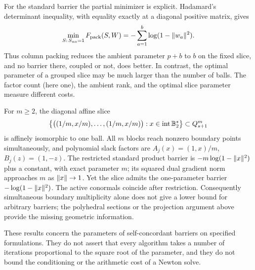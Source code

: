 For the standard barrier the partial minimizer is explicit.
Hadamard's determinant inequality, with equality exactly at a diagonal
positive matrix, gives
\[
 \min_{S:\,S_{aa}=1}F_{\mathrm{pack}}(S,W)
 =-\sum_{a=1}^b\log(1-\lVert w_a\rVert^2).
\]
Thus column packing reduces the ambient parameter $p+b$ to $b$ on the
fixed slice, and no barrier there, coupled or not, does better.
In contrast, the optimal parameter of a grouped slice may be much larger
than the number of balls.  The factor count (here one), the ambient
rank, and the optimal slice parameter measure different costs.

\begin{example}
\label{ex:duplicated-barrier}
For $m\geq2$, the diagonal affine slice
\[
 \left\{\bigl((1/m,x/m),\ldots,(1/m,x/m)\bigr):
                          x\in\operatorname{int}\mathbb B_2^s\right\}\subset Q_{s+1}^m
\]
is affinely isomorphic to one ball.  All $m$ blocks reach nonzero
boundary points simultaneously, and polynomial slack factors are
$A_j(x)=(1,x)/m$, $B_j(z)=(1,-z)$.
The restricted standard product barrier is
$-m\log(1-\lVert x\rVert^2)$ plus a constant, with exact parameter $m$;
its squared dual gradient norm approaches $m$ as $\lVert x\rVert\to1$.
Yet the slice admits the one-parameter barrier
$-\log(1-\lVert x\rVert^2)$.  The active conormals coincide after
restriction.  Consequently simultaneous boundary multiplicity
alone does not give a lower bound for arbitrary barriers;
the polyhedral sections or the projection argument above provide the
missing geometric information.
\end{example}

These results concern the parameters of self-concordant barriers on
specified formulations.  They do not assert that every algorithm
takes a number of iterations proportional to the square root of the
parameter, and they do not bound the conditioning or the arithmetic
cost of a Newton solve.
